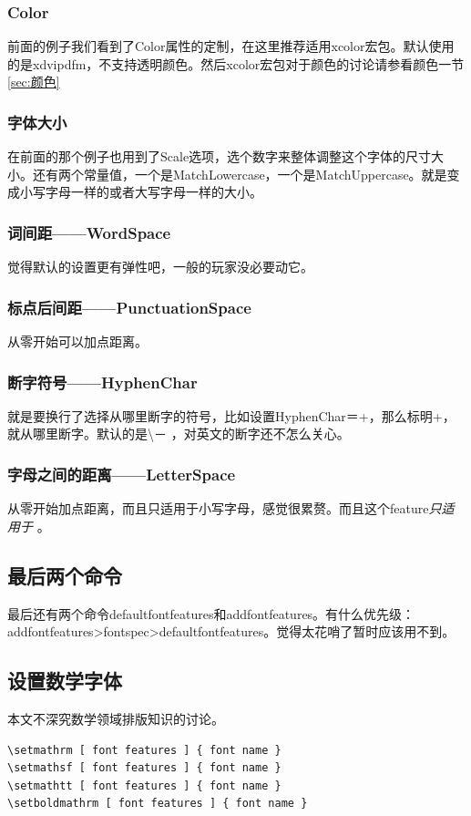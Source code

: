 \documentclass[11pt,oneside]{book}
\begin{document}
\begin{common-format}
\subsubsection{Color}
前面的例子我们看到了Color属性的定制，在这里推荐适用xcolor宏包。\XeLaTeX 默认使用的是xdvipdfm，不支持透明颜色。然后xcolor宏包对于颜色的讨论请参看颜色一节\ref{sec:颜色}

\subsubsection{字体大小}
在前面的那个例子也用到了Scale选项，选个数字来整体调整这个字体的尺寸大小。还有两个常量值，一个是MatchLowercase，一个是MatchUppercase。就是变成小写字母一样的或者大写字母一样的大小。

\subsubsection{词间距——WordSpace}
觉得默认的设置更有弹性吧，一般的玩家没必要动它。

\subsubsection{标点后间距——PunctuationSpace}
从零开始可以加点距离。

\subsubsection{断字符号——HyphenChar}
就是要换行了选择从哪里断字的符号，比如设置HyphenChar＝{+}，那么标明+，就从哪里断字。默认的是\textbackslash － ，对英文的断字还不怎么关心。

\subsubsection{字母之间的距离——LetterSpace}
从零开始加点距离，而且只适用于小写字母，感觉很累赘。而且这个feature\emph{只适用于\XeTeX} 。


\subsection{最后两个命令}
最后还有两个命令defaultfontfeatures和addfontfeatures。有什么优先级：\\ addfontfeatures>fontspec>defaultfontfeatures。觉得太花哨了暂时应该用不到。


\subsection{设置数学字体}
本文不深究数学领域排版知识的讨论。
\begin{Verbatim}
\setmathrm [ font features ] { font name }
\setmathsf [ font features ] { font name }
\setmathtt [ font features ] { font name }
\setboldmathrm [ font features ] { font name }
\end{Verbatim}



\end{common-format}
\end{document}
